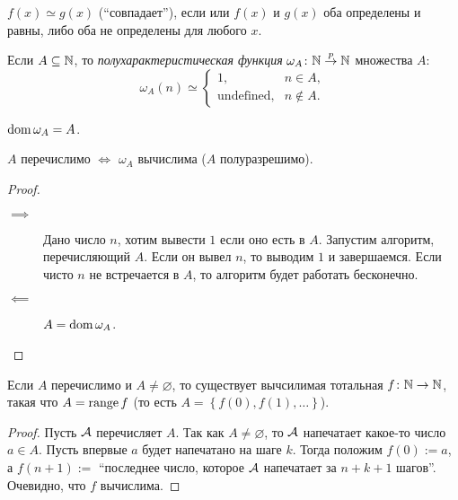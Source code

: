 \begin{definition}
    $f(x) \simeq g(x)$ (\enquote{совпадает}), если или $f(x)$ и $g(x)$ оба определены и равны, либо оба не определены для любого $x$.
\end{definition}

\begin{definition}
    Если $A \subseteq \N$, то \textit{полухарактеристическая функция} $\omega_A \colon \N \pto \N$ множества $A$:
    $$
        \omega_A(n) \simeq \begin{cases}
            1, &n \in A, \\
            \text{undefined}, &n \notin A.
        \end{cases}
    $$
\end{definition}

\begin{comment*}
    $\dom \omega_A = A$.
\end{comment*}

\begin{statement}
    $A$ перечислимо $\iff$ $\omega_A$ вычислима ($A$ полуразрешимо).
\end{statement}

\begin{proof}~
    \begin{description}
    \item[$\implies$] 
        Дано число $n$, хотим вывести $1$ если оно есть в $A$.
        Запустим алгоритм, перечисляющий $A$. Если он вывел $n$, то выводим $1$ и завершаемся.
        Если чисто $n$ не встречается в $A$, то алгоритм будет работать бесконечно.
    \item[$\impliedby$] 
        $A = \dom \omega_A$.
        \qedhere
    \end{description}
\end{proof}

\begin{statement}
    Если $A$ перечислимо и $A \neq \varnothing$, то существует вычсилимая тотальная $f \colon \N \to \N$, такая что $A = \range f$ (то есть $A = \left\{f(0), f(1), \dots\right\}$).
\end{statement}

\begin{proof}
    Пусть $\AA$ перечисляет $A$. Так как $A \neq \varnothing$, то $\AA$ напечатает какое-то число $a \in A$.
    Пусть впервые $a$ будет напечатано на шаге $k$.
    Тогда положим $f(0) := a$, а $f(n + 1) := $ \enquote{последнее число, которое $\AA$ напечатает за $n + k + 1$ шагов}.
    Очевидно, что $f$ вычислима.
\end{proof}

